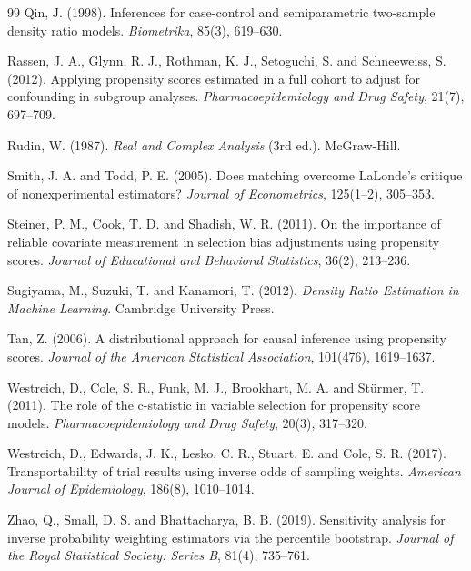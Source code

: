 \documentclass[11pt,a4paper]{article}
\theoremstyle{plain}
\theoremstyle{definition}
\begin{document}
\begin{thebibliography}{99}
 Qin, J. (1998). Inferences for case-control and semiparametric two-sample density ratio models. \emph{Biometrika}, 85(3), 619--630.

 Rassen, J. A., Glynn, R. J., Rothman, K. J., Setoguchi, S. and Schneeweiss, S. (2012). Applying propensity scores estimated in a full cohort to adjust for confounding in subgroup analyses. \emph{Pharmacoepidemiology and Drug Safety}, 21(7), 697--709.

 Rudin, W. (1987). \emph{Real and Complex Analysis} (3rd ed.). McGraw-Hill.

 Smith, J. A. and Todd, P. E. (2005). Does matching overcome LaLonde's critique of nonexperimental estimators? \emph{Journal of Econometrics}, 125(1--2), 305--353.

 Steiner, P. M., Cook, T. D. and Shadish, W. R. (2011). On the importance of reliable covariate measurement in selection bias adjustments using propensity scores. \emph{Journal of Educational and Behavioral Statistics}, 36(2), 213--236.

 Sugiyama, M., Suzuki, T. and Kanamori, T. (2012). \emph{Density Ratio Estimation in Machine Learning}. Cambridge University Press.

 Tan, Z. (2006). A distributional approach for causal inference using propensity scores. \emph{Journal of the American Statistical Association}, 101(476), 1619--1637.

 Westreich, D., Cole, S. R., Funk, M. J., Brookhart, M. A. and Stürmer, T. (2011). The role of the c-statistic in variable selection for propensity score models. \emph{Pharmacoepidemiology and Drug Safety}, 20(3), 317--320.

 Westreich, D., Edwards, J. K., Lesko, C. R., Stuart, E. and Cole, S. R. (2017). Transportability of trial results using inverse odds of sampling weights. \emph{American Journal of Epidemiology}, 186(8), 1010--1014.

 Zhao, Q., Small, D. S. and Bhattacharya, B. B. (2019). Sensitivity analysis for inverse probability weighting estimators via the percentile bootstrap. \emph{Journal of the Royal Statistical Society: Series B}, 81(4), 735--761.


\end{thebibliography}
\end{document}
